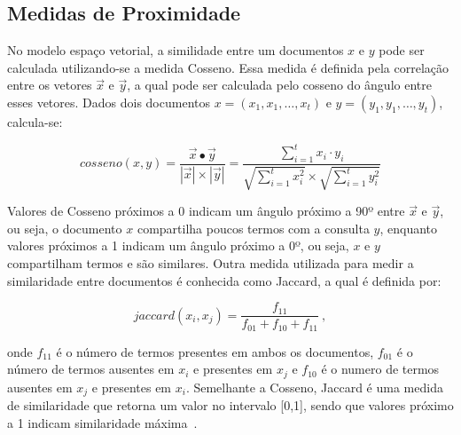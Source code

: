 
\subsection*{Medidas de Proximidade}
\label{subsec:MedidasProximidade}
No modelo espaço vetorial, a similidade entre um documentos $x$ e $y$ pode ser calculada utilizando-se a medida Cosseno. Essa medida é definida pela correlação entre os vetores $\vec{x}$ e $\vec{y}$, a qual pode ser calculada pelo cosseno do  ângulo entre esses vetores. Dados dois documentos $x = (x_1, x_1, \dots, x_t)$ e $y = (y_1, y_1, \dots, y_t)$, calcula-se: 




\begin{equation}
cosseno(x, y) = \frac{ \vec{x} \bullet \vec{y} }
                   { |\vec{x}| \times | \vec{y}|}
            = \frac{ \sum_{i=1}^{t} x_i \cdot y_i}
                   { \sqrt{\sum_{i=1}^{t} x_i^2} \times \sqrt{\sum_{i=1}^{t} y_i^2 } }                      \label{equ:cosine}
\end{equation} 


Valores de Cosseno próximos a 0 indicam um ângulo próximo a 90º entre $\vec{x}$ e $\vec{y}$, ou seja, o documento $x$ compartilha poucos termos com a consulta $y$, enquanto valores próximos a 1 indicam um ângulo próximo a 0º, ou seja, $x$ e $y$ compartilham termos e são similares.
%
Outra medida utilizada para medir a similaridade entre documentos é conhecida como Jaccard, a qual é definida por:

\begin{equation}
jaccard(x_i, x_j) = \frac{f_{11}}{f_{01} + f_{10} + f_{11}}~,
\end{equation}

\noindent
onde 
$f_{11}$ é o número de termos presentes em ambos os documentos,
$f_{01}$ é o número de termos ausentes em $x_i$ e presentes em $x_j$ e
$f_{10}$ é o numero de termos ausentes em $x_j$ e presentes em $x_i$.
%
Semelhante a Cosseno, Jaccard é uma medida de similaridade que retorna um valor no intervalo [0,1], sendo que valores próximo a 1 indicam similaridade máxima~\cite{Maracini2010,Tan2005,Feldman2006}.
